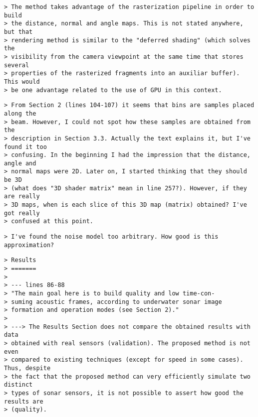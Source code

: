 \documentclass{article}
\begin{document}

\begin{verbatim}
> The method takes advantage of the rasterization pipeline in order to build
> the distance, normal and angle maps. This is not stated anywhere, but that
> rendering method is similar to the "deferred shading" (which solves the
> visibility from the camera viewpoint at the same time that stores several
> properties of the rasterized fragments into an auxiliar buffer). This would
> be one advantage related to the use of GPU in this context.
\end{verbatim}


\begin{verbatim}
> From Section 2 (lines 104-107) it seems that bins are samples placed along the
> beam. However, I could not spot how these samples are obtained from the
> description in Section 3.3. Actually the text explains it, but I've found it too
> confusing. In the beginning I had the impression that the distance, angle and
> normal maps were 2D. Later on, I started thinking that they should be 3D
> (what does "3D shader matrix" mean in line 257?). However, if they are really
> 3D maps, when is each slice of this 3D map (matrix) obtained? I've got really
> confused at this point.
\end{verbatim}


\begin{verbatim}
> I've found the noise model too arbitrary. How good is this approximation?
\end{verbatim}


\begin{verbatim}
> Results
> =======
>
> --- lines 86-88
> "The main goal here is to build quality and low time-con-
> suming acoustic frames, according to underwater sonar image
> formation and operation modes (see Section 2)."
>
> ---> The Results Section does not compare the obtained results with data
> obtained with real sensors (validation). The proposed method is not even
> compared to existing techniques (except for speed in some cases). Thus, despite
> the fact that the proposed method can very efficiently simulate two distinct
> types of sonar sensors, it is not possible to assert how good the results are
> (quality).
\end{verbatim}
\end{document}
